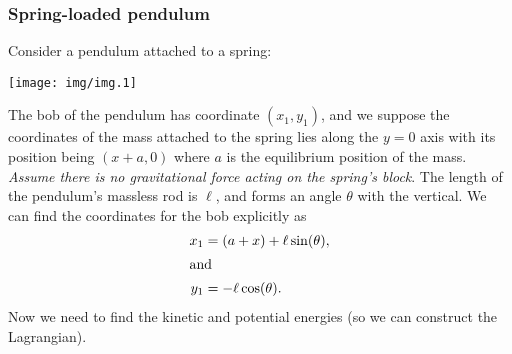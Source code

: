 \subsubsection{Spring-loaded pendulum}
Consider a pendulum attached to a spring:
\begin{center}
  \texttt{[image: img/img.1]}
\end{center}
The bob of the pendulum has coordinate $(x_{1}, y_{1})$, and we suppose
the coordinates of the mass attached to the spring lies along the $y=0$
axis with its position being $(x + a, 0)$ where $a$ is the equilibrium
position of the mass. \emph{Assume there is no gravitational force
acting on the spring's block}. The
length of the pendulum's massless rod is $\ell$, and forms an angle
$\theta$ with the vertical. We can find the coordinates for the bob
explicitly as
\begin{subequations}
  \begin{align}
    x_{1} &= (a + x) + \ell\sin(\theta),\\
    \intertext{and}
    y_{1} &= - \ell\cos(\theta).
  \end{align}
\end{subequations}
Now we need to find the kinetic and potential energies (so we can
construct the Lagrangian).


